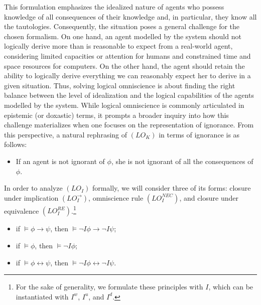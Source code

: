\documentclass{article}
\begin{document}
This formulation emphasizes the idealized nature of agents who possess knowledge of all consequences of their knowledge and, in particular, they know all the tautologies. Consequently, the situation poses a general challenge for the chosen formalism. On one hand, an agent modelled by the system should not logically derive more than is reasonable to expect from a real-world agent, considering limited capacities or attention for humans and constrained time and space resources for computers. On the other hand, the agent should retain the ability to logically derive everything we can reasonably expect her to derive in a given situation. Thus, solving logical omniscience is about finding the right balance between the level of idealization and the logical capabilities of the agents modelled by the system. While logical omniscience is commonly articulated in epistemic (or doxastic) terms, it prompts a broader inquiry into how this challenge materializes when one focuses on the representation of ignorance. From this perspective, a natural rephrasing of $(LO_{K})$ in terms of ignorance is as follows:




\begin{itemize}

\item[$(LO_{I})$] If an agent is not ignorant of $\phi$, she is not ignorant of all the consequences of $\phi$.

\end{itemize}

In order to analyze $(LO_{I})$ formally, we will consider three of its forms: closure under implication $(LO^{\rightarrow}_{I})$, omniscience rule $(LO^{NEC}_{I})$, and closure under equivalence $(LO^{RE}_{I})$.\footnote{For the sake of generality, we formulate these principles with $I$, which can be instantiated with $I^{w}$, $I^{u}$, and $I^{d}$.}

\begin{itemize}

\item[$(LO^{\rightarrow}_{I}$)] if $\models \phi \rightarrow \psi$, then $\models \neg I \phi \rightarrow \neg I \psi$;

\item[$(LO^{NEC}_{I}$)] if $\models \phi$, then $\models \neg I \phi$;

\item[$(LO^{RE}_{I}$)] if $\models \phi \leftrightarrow \psi$, then $\models \neg I \phi \leftrightarrow \neg I \psi$.


\end{itemize}
\end{document}
